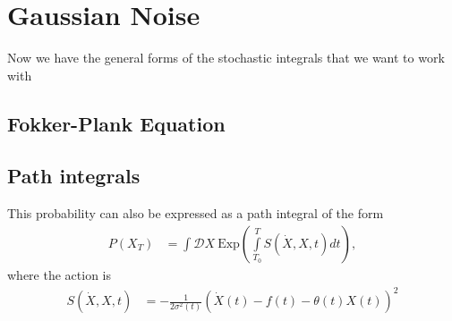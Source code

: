 \documentclass[10pt,a4paper]{article}
\begin{document}
\section{Gaussian Noise}
Now we have the general forms of the stochastic integrals that we want to work with


\subsection{Fokker-Plank Equation}

\subsection{Path integrals}
This probability can also be expressed as a path integral of the form
\begin{align}
P(X_T)  &=  \int \mathcal{D}X \ \text{Exp}\left(\int\limits_{T_0}^T S(\dot{X},X,t)  dt \right),
\end{align}
where the action is
\begin{align}
S(\dot{X},X,t) &= -\frac{1}{2\sigma^{2}(t)}\left( \dot{X}(t)-f(t)-\theta(t) X(t) \right)^2
\end{align}
\end{document}
